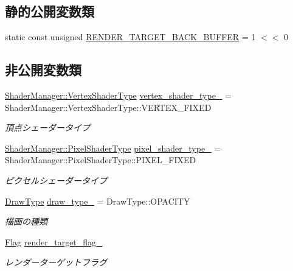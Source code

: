 \subsection*{静的公開変数類}
\begin{DoxyCompactItemize}
\item 
static const unsigned \mbox{\hyperlink{class_draw_order_list_a75498416e70da9517427695271d4b5e7}{R\+E\+N\+D\+E\+R\+\_\+\+T\+A\+R\+G\+E\+T\+\_\+\+B\+A\+C\+K\+\_\+\+B\+U\+F\+F\+ER}} = 1 $<$$<$ 0
\end{DoxyCompactItemize}
\subsection*{非公開変数類}
\begin{DoxyCompactItemize}
\item 
\mbox{\hyperlink{class_shader_manager_a9b51e49d70eb3cc58f6d1f3994e8cfbd}{Shader\+Manager\+::\+Vertex\+Shader\+Type}} \mbox{\hyperlink{class_draw_order_list_afcb0968108f4e6932358393a8bc90a8b}{vertex\+\_\+shader\+\_\+type\+\_\+}} = Shader\+Manager\+::\+Vertex\+Shader\+Type\+::\+V\+E\+R\+T\+E\+X\+\_\+\+F\+I\+X\+ED
\begin{DoxyCompactList}\small\item\em 頂点シェーダータイプ \end{DoxyCompactList}\item 
\mbox{\hyperlink{class_shader_manager_a7d15d773b3c6a99dd7086c45c8b0be5f}{Shader\+Manager\+::\+Pixel\+Shader\+Type}} \mbox{\hyperlink{class_draw_order_list_a8c2adbcac9f724deae8da0a698e93c57}{pixel\+\_\+shader\+\_\+type\+\_\+}} = Shader\+Manager\+::\+Pixel\+Shader\+Type\+::\+P\+I\+X\+E\+L\+\_\+\+F\+I\+X\+ED
\begin{DoxyCompactList}\small\item\em ピクセルシェーダータイプ \end{DoxyCompactList}\item 
\mbox{\hyperlink{class_draw_order_list_a6c9b9ceb312c16d399ef355f4f3486bb}{Draw\+Type}} \mbox{\hyperlink{class_draw_order_list_ad2ce43c1b177ba4dae4198aa272eeb23}{draw\+\_\+type\+\_\+}} = Draw\+Type\+::\+O\+P\+A\+C\+I\+TY
\begin{DoxyCompactList}\small\item\em 描画の種類 \end{DoxyCompactList}\item 
\mbox{\hyperlink{class_flag}{Flag}} \mbox{\hyperlink{class_draw_order_list_a8da2b635d5b2a9191088f9180d1fe6d6}{render\+\_\+target\+\_\+flag\+\_\+}}
\begin{DoxyCompactList}\small\item\em レンダーターゲットフラグ \end{DoxyCompactList}\item 

\end{DoxyCompactItemize}
